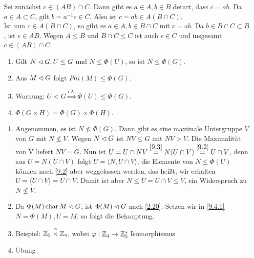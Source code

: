 \begin{beweis}
 Sei zun\"achst $c\in (AB)\cap C$. Dann gibt es $a\in A, b\in B$ derart, dass $c=ab$. Da $a\in A\subset C$, gilt $b=a^{-1}c\in C$. Also ist $c=ab \in A(B\cap C)$.\\
Ist nun $c\in A(B\cap C)$, so gibt es $a\in A, b\in B\cap C$ mit $c=ab$. Da $b\in B\cap C\subset B$, ist $c\in AB$. Wegen $A\leq B$ und $B\cap C\leq C$ ist auch $c\in C$ und insgesamt $c\in (AB)\cap C$.
\end{beweis}

\begin{satz} \spspace
{}
 \begin{enumerate}
 \item Gilt $N\lhd G, U\leq G$ und $N\leq \Phi(U)$, so ist $N\leq \Phi(G)$. \label{9.4.1}
 \item Aus $M\lhd G$ folgt $Phi(M)\leq \Phi(G)$.
 \item Warnung: $U < G \stackrel{\text{i.A.}}{\Longrightarrow} \Phi(U)\leq \Phi(G)$.
 \item $\Phi(G\times H)=\Phi(G)\times \Phi(H)$.
\end{enumerate}
 
\end{satz}

\begin{beweis}\spspace
 \begin{enumerate}
 \item Angenommen, es ist $N\nleq \Phi(G)$. Dann gibt es eine maximale Untergruppe $V$ von $G$ mit $N\nleq V$. Wegen $N\lhd G$ ist $NV\leq G$ mit $NV > V$. Die Maximalit\"at von V liefert $NV=G$. Nun ist $U=U\cap NV \stackrel{\ref{9.3}}{=}N(U\cap V)\stackrel{\ref{9.2}}{=}U\cap V$, denn aus $U=N(U\cap V)$ folgt $U=\langle N, U\cap V\rangle$, die Elemente von $N\leq \Phi(U)$ k\"onnen nach \ref{9.2} aber weggelassen werden, das hei\ss{}t, wir erhalten $U=\langle U\cap V\rangle = U\cap V$. Damit ist aber $N\leq U=U\cap V\leq V$, ein Widerspruch zu $N\nleq V$.
 \item Da $\Phi(M)\operatorname{char} M\lhd G$, ist $\Phi(M)\lhd G$ nach \ref{2.20}. Setzen wir in \ref{9.4.1} $N=\Phi(M), U=M$, so folgt die Behauptung.
 \item Beispiel: $\mathbb{Z}_5 \stackrel{\varphi}{\rtimes}\mathbb{Z}_4$, wobei $\varphi:\mathbb{Z}_4\to\mathbb{Z}_5^*$ Isomorphismus
 \item \"Ubung
\end{enumerate}

\end{beweis}

